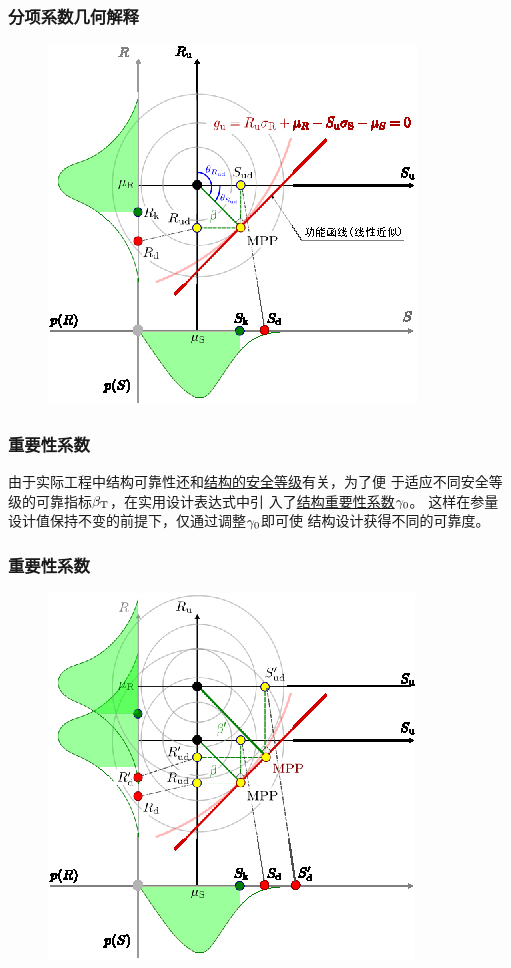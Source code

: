 \documentclass[xcolor=dvipsnames,8pt,handout]{beamer}
\begin{document}
\begin{frame}
  \frametitle{分项系数几何解释}
  \begin{figure}[H]
    \centering
    \includegraphics[height=0.8\textheight]{normalspace.eps}
  \end{figure}
\end{frame}

\begin{frame}
  \frametitle{重要性系数}
  \begin{discuss}
  由于实际工程中结构可靠性还和\underline{结构的安全等级}有关，为了便
  于适应不同安全等级的可靠指标$\beta_\mathrm{T}$，在实用设计表达式中引
  入了\underline{结构重要性系数$\gamma_\mathrm{0}$}。
  这样在参量设计值保持不变的前提下，仅通过调整$\gamma_\mathrm{0}$即可使
  结构设计获得不同的可靠度。  
    \end{discuss}
\end{frame}

\begin{frame}
  \frametitle{重要性系数}
    \begin{figure}[H]
      \centering
      \includegraphics[height=0.8\textheight]{betamore.eps}
    \end{figure}
\end{frame}
\end{document}
